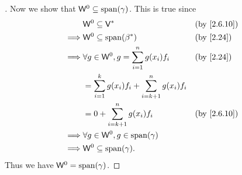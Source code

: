 \begin{proof}[]
  Now we show that \(\W^0 \subseteq \spn{\gamma}\).
  This is true since
  \begin{align*}
             & \W^0 \subseteq \V^*                                         &  & \text{(by \cref{2.6.10})} \\
    \implies & \W^0 \subseteq \spn{\beta^*}                                &  & \text{(by \cref{2.24})}   \\
    \implies & \forall g \in \W^0, g = \sum_{i = 1}^n g(x_i) f_i           &  & \text{(by \cref{2.24})}   \\
             & = \sum_{i = 1}^k g(x_i) f_i + \sum_{i = k + 1}^n g(x_i) f_i                                \\
             & = 0 + \sum_{i = k + 1}^n g(x_i) f_i                         &  & \text{(by \cref{2.6.10})} \\
    \implies & \forall g \in \W^0, g \in \spn{\gamma}                                                     \\
    \implies & \W^0 \subseteq \spn{\gamma}.
  \end{align*}
  Thus we have \(\W^0 = \spn{\gamma}\).
\end{proof}
